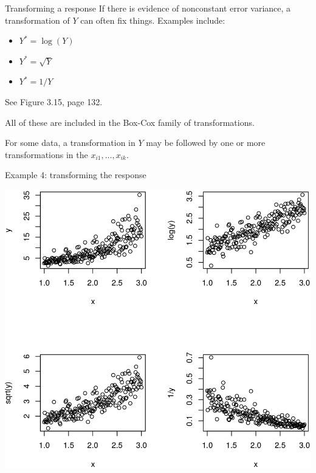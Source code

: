 \documentclass{beamer}
\begin{document}
\begin{frame}{Transforming a response}
If there is evidence of nonconstant error variance, a transformation of $Y$ can often fix things. Examples include:
\begin{itemize}
\item $Y^\ast=\log(Y)$
\item $Y^\ast=\sqrt{Y}$
\item $Y^\ast=1/Y$
\end{itemize}
See Figure 3.15, page 132.
\vspace{10pt}

All of these are included in the Box-Cox family of transformations.
\vspace{10pt}

For some data, a transformation in $Y$ may be followed by one or more transformations in the $x_{i1},\ldots, x_{ik}$.
\end{frame}

\begin{frame}{Example 4: transforming the response}
\centerline{\includegraphics[scale=0.25]{plots/transf4}}
\end{frame}
\end{document}
